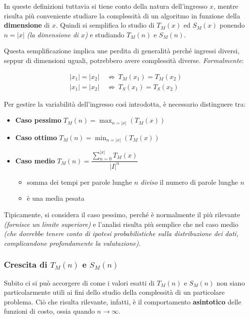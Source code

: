 \documentclass[italian, 10pt]{article}
\begin{document}
In queste definizioni tuttavia si tiene conto della natura dell'ingresso \(x\), mentre risulta più conveniente studiare la complessità di un algoritmo in funzione della \textbf{dimensione} di \(x\).
Quindi si semplifica lo studio di \(T_M(x)\) ed \(S_M(x)\) ponendo \(n = |x|\) \textit{(la dimensione di \(x\))} e studiando \(T_M(n)\) e \(S_M(n)\).

Questa semplificazione implica une perdita di generalità perché ingressi diversi, seppur di dimensioni uguali, potrebbero avere complessità diverse.
\textit{Formalmente}:

\begin{align*}
  |x_1| = |x_2| \  & \nRightarrow  \ T_M(x_1) = T_M(x_2) \\
  |x_1| = |x_2| \  & \nRightarrow \ T_S(x_1) = T_S(x_2)
\end{align*}

\bigskip
Per gestire la variabilità dell'ingresso così introdotta, è necessario distinguere tra:
\begin{itemize}[itemsep=5pt]
  \item \textbf{Caso pessimo} \(T_M(n) = \displaystyle \max_{n = |x|} \left(T_M(x)\right) \)
  \item \textbf{Caso ottimo} \(T_M(n) = \displaystyle \min_{n = |x|} \left(T_M(x)\right) \)
  \item \textbf{Caso medio} \(T_M(n) = \dfrac{\displaystyle \sum_{n = 0}^{|x|} T_M(x)}{|I|^n} \)
        \begin{itemize}[label=\(\rightarrow\)]
          \item somma dei tempi per parole lunghe \(n\) \textit{diviso} il numero di parole lunghe \(n\)
          \item è una media pesata
        \end{itemize}
\end{itemize}

Tipicamente, si considera il caso pessimo, perché è normalmente il più rilevante \textit{(fornisce un limite superiore)} e l'analisi risulta più semplice che nel caso medio \textit{(che dovrebbe tenere conto di ipotesi probabilistiche sulla distribuzione dei dati, complicandone profondamente la valutazione)}.

\subsubsection[Crescita di T(n) e S(n)]{Crescita di \(T_M(n)\) e \(S_M(n)\)}

Subito ci si può accorgere di come i valori esatti di \(T_M(n)\) e \(S_M(n)\) non siano particolarmente utili ai fini dello studio della complessità di un particolare problema.
Ciò che risulta rilevante, infatti, è il comportamento \textbf{asintotico} delle funzioni di costo, ossia quando \(n \rightarrow \infty\).
\end{document}
